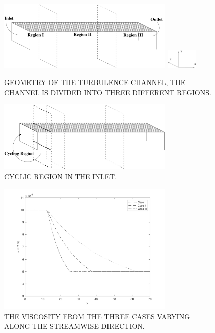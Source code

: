 \documentclass[twocolumn,10pt]{asme2e}
\begin{document}
\begin{figure}[!htbp]
	\centering
	\includegraphics[trim = 20mm 15mm 30mm 10mm, width = 85mm]{turbchannel_a.png}
	\includegraphics[trim = 0mm 0mm 0mm 20mm, width = 15mm]{axis.png}
	\caption{GEOMETRY OF THE TURBULENCE CHANNEL, THE CHANNEL IS DIVIDED INTO THREE DIFFERENT REGIONS.} %
	\label{fig:geometries}
	\end{figure}

\begin{figure}[!htbp]
	\centering
	\includegraphics[trim = 20mm 15mm 30mm 10mm, width = 85mm]{turbchannel_b.png}
	\caption{CYCLIC REGION IN THE INLET.} 
	\label{fig:inlet}
\end{figure}

\begin{figure}[!htbp]
	\centering
	\includegraphics[trim = 20mm 15mm 30mm 10mm, width = 85mm]{viscosity.png}
	\caption{THE VISCOSITY FROM THE THREE CASES VARYING ALONG THE STREAMWISE DIRECTION.}
	\label{fig:viscosity_cases}
	\end{figure}
\end{document}
